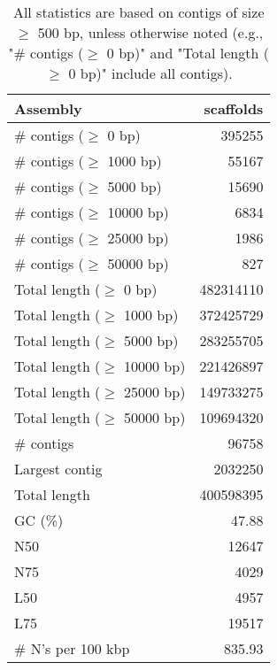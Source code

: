 \documentclass[12pt,a4paper]{article}
\begin{document}
\begin{table}[ht]
\begin{center}
\caption{All statistics are based on contigs of size $\geq$ 500 bp, unless otherwise noted (e.g., "\# contigs ($\geq$ 0 bp)" and "Total length ($\geq$ 0 bp)" include all contigs).}
\begin{tabular}{|l*{1}{|r}|}
\hline
Assembly & scaffolds \\ \hline
\# contigs ($\geq$ 0 bp) & 395255 \\ \hline
\# contigs ($\geq$ 1000 bp) & 55167 \\ \hline
\# contigs ($\geq$ 5000 bp) & 15690 \\ \hline
\# contigs ($\geq$ 10000 bp) & 6834 \\ \hline
\# contigs ($\geq$ 25000 bp) & 1986 \\ \hline
\# contigs ($\geq$ 50000 bp) & 827 \\ \hline
Total length ($\geq$ 0 bp) & 482314110 \\ \hline
Total length ($\geq$ 1000 bp) & 372425729 \\ \hline
Total length ($\geq$ 5000 bp) & 283255705 \\ \hline
Total length ($\geq$ 10000 bp) & 221426897 \\ \hline
Total length ($\geq$ 25000 bp) & 149733275 \\ \hline
Total length ($\geq$ 50000 bp) & 109694320 \\ \hline
\# contigs & 96758 \\ \hline
Largest contig & 2032250 \\ \hline
Total length & 400598395 \\ \hline
GC (\%) & 47.88 \\ \hline
N50 & 12647 \\ \hline
N75 & 4029 \\ \hline
L50 & 4957 \\ \hline
L75 & 19517 \\ \hline
\# N's per 100 kbp & 835.93 \\ \hline
\end{tabular}
\end{center}
\end{table}
\end{document}
